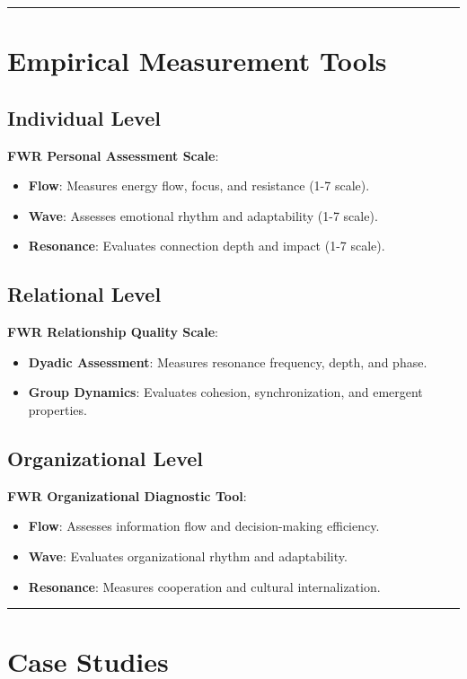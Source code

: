 \documentclass{article}
\begin{document}
\hrule

\section{Empirical Measurement Tools}
\subsection{Individual Level}
\textbf{FWR Personal Assessment Scale}:
\begin{itemize}
    \item \textbf{Flow}: Measures energy flow, focus, and resistance (1-7 scale).
    \item \textbf{Wave}: Assesses emotional rhythm and adaptability (1-7 scale).
    \item \textbf{Resonance}: Evaluates connection depth and impact (1-7 scale).
\end{itemize}

\subsection{Relational Level}
\textbf{FWR Relationship Quality Scale}:
\begin{itemize}
    \item \textbf{Dyadic Assessment}: Measures resonance frequency, depth, and phase.
    \item \textbf{Group Dynamics}: Evaluates cohesion, synchronization, and emergent properties.
\end{itemize}

\subsection{Organizational Level}
\textbf{FWR Organizational Diagnostic Tool}:
\begin{itemize}
    \item \textbf{Flow}: Assesses information flow and decision-making efficiency.
    \item \textbf{Wave}: Evaluates organizational rhythm and adaptability.
    \item \textbf{Resonance}: Measures cooperation and cultural internalization.
\end{itemize}

\hrule

\section{Case Studies}
\end{document}
